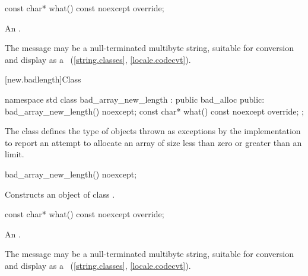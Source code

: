 %
\begin{itemdecl}
const char* what() const noexcept override;
\end{itemdecl}

\begin{itemdescr}
\pnum
\returns
An  \ntbs{}.

\pnum
\remarks
The message may be a null-terminated multibyte string,
suitable for conversion and display as a
~(\ref{string.classes}, \ref{locale.codecvt}).
\end{itemdescr}

%
[new.badlength]{Class }

\begin{codeblock}
namespace std {
  class bad_array_new_length : public bad_alloc {
  public:
    bad_array_new_length() noexcept;
    const char* what() const noexcept override;
  };
}
\end{codeblock}

\pnum
The class  defines the type of objects thrown as
exceptions by the implementation to report an attempt to allocate an array of size
less than zero or
greater than an  limit.

%
\begin{itemdecl}
bad_array_new_length() noexcept;
\end{itemdecl}

\begin{itemdescr}
\pnum
\effects Constructs an object of class .
\end{itemdescr}

%
\begin{itemdecl}
const char* what() const noexcept override;
\end{itemdecl}

\begin{itemdescr}
\pnum
\returns
An  \ntbs{}.

\pnum
\remarks
The message may be a null-terminated multibyte string,
suitable for conversion and display as a
~(\ref{string.classes}, \ref{locale.codecvt}).
\end{itemdescr}

